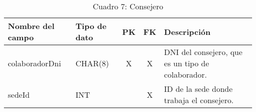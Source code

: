\begin{table}[H]
	\centering
	\begin{tabular}{|l|l|c|c|l|}
		\hline
		\textbf{Nombre del campo} & \textbf{Tipo de dato} & \textbf{PK} & \textbf{FK} & \textbf{Descripción}                              \\
		\hline
		colaboradorDni            & CHAR(8)               & X           & X           & DNI del consejero, que es un tipo de colaborador. \\
		\hline
		sedeId                    & INT                   &             & X           & ID de la sede donde trabaja el consejero.         \\
		\hline
	\end{tabular}
	\caption{Cuadro 7: Consejero}
\end{table}
